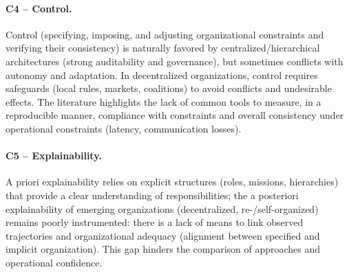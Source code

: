 \paragraph{C4 -- Control.}
Control (specifying, imposing, and adjusting organizational constraints and verifying their consistency) is naturally favored by centralized/hierarchical architectures (strong auditability and governance), but sometimes conflicts with autonomy and adaptation. In decentralized organizations, control requires safeguards (local rules, markets, coalitions) to avoid conflicts and undesirable effects. The literature highlights the lack of common tools to measure, in a reproducible manner, compliance with constraints and overall consistency under operational constraints (latency, communication losses).

\paragraph{C5 -- Explainability.}
A priori explainability relies on explicit structures (roles, missions, hierarchies) that provide a clear understanding of responsibilities; the a posteriori explainability of emerging organizations (decentralized, re-/self-organized) remains poorly instrumented: there is a lack of means to link observed trajectories and organizational adequacy (alignment between specified and implicit organization). This gap hinders the comparison of approaches and operational confidence.

